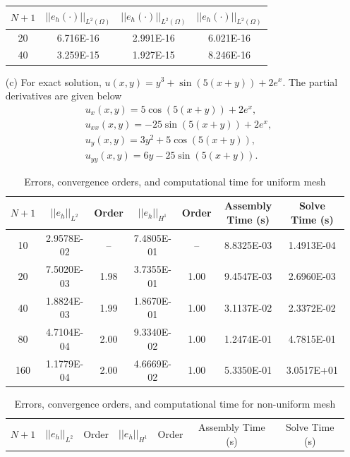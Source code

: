 \documentclass[11pt]{article}      %
\begin{document}
\begin{enumerate}
\begin{table}[!h]
\begin{tabular}{|c|c|c|c|}
		\hline
		$N+1$ & $||e_h(\cdot)||_{L^2(\Omega)}$ & $||e_h(\cdot)||_{L^2(\Omega)}$ & $||e_h(\cdot)||_{L^2(\Omega)}$\\
		\hline
		20    & 6.716E-16   & 2.991E-16     & 6.021E-16\\
		40   & 3.259E-15  & 1.927E-15 & 8.246E-16\\
		\hline
	\end{tabular}
	\label{tab2}
\end{table}
\item[(c)] For exact solution, $u(x,y) = y^3 + \sin(5(x+y)) + 2e^x$. The partial derivatives are given below
\begin{align*}
	&u_x(x,y) = 5\cos(5(x+y)) + 2e^x,\\
	&u_{xx}(x,y) = -25\sin(5(x+y)) + 2e^x,\\
	&u_y(x,y)= 3y^2 + 5\cos(5(x+y)), \\
	&u_{yy}(x,y) = 6y -25\sin(5(x+y)).
\end{align*}
\begin{table}[!h]
	\caption{Errors, convergence orders, and computational time for uniform mesh}
	\vspace{0.1in}
	\centering
	\begin{tabular}{|c|c|c|c|c|c|c|}
		\hline
		$N+1$ & $||e_h||_{L^2}$ & Order & $||e_h||_{H^1}$ & Order & Assembly Time (s) & Solve Time (s) \\
		\hline
		10   & 2.9578E-02 & --    & 7.4805E-01 & --    & 8.8325E-03 & 1.4913E-04 \\
		20   & 7.5020E-03 & 1.98  & 3.7355E-01 & 1.00  & 9.4547E-03 & 2.6960E-03 \\
		40   & 1.8824E-03 & 1.99  & 1.8670E-01 & 1.00  & 3.1137E-02 & 2.3372E-02 \\
		80   & 4.7104E-04 & 2.00  & 9.3340E-02 & 1.00  & 1.2474E-01 & 4.7815E-01 \\
		160  & 1.1779E-04 & 2.00  & 4.6669E-02 & 1.00  & 5.3350E-01 & 3.0517E+01 \\
		\hline
	\end{tabular}
	\label{tab_fem_results_time}
\end{table}
\begin{table}[!h]
	\caption{Errors, convergence orders, and computational time for non-uniform mesh}
	\vspace{0.1in}
	\centering
	\begin{tabular}{|c|c|c|c|c|c|c|}
		\hline
		$N+1$ & $||e_h||_{L^2}$ & Order & $||e_h||_{H^1}$ & Order & Assembly Time (s) & Solve Time (s) \\

\end{tabular}
\end{table}
\end{enumerate}
\end{document}

